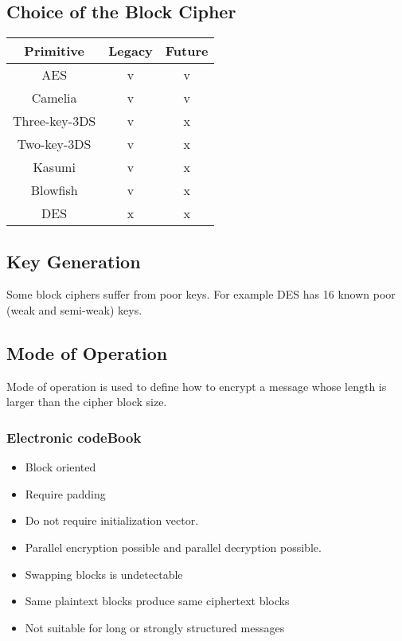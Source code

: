 
\subsection{Choice of the Block Cipher}
\begin{center}
    \begin{tabular}{|c|c|c|}
        \hline
        \textbf{Primitive} & \textbf{Legacy} & \textbf{Future} \\
        \hline
        AES & \textcolor{green!50!black}{v} &
        \textcolor{green!50!black}{v} \\
        Camelia & \textcolor{green!50!black}{v} &
        \textcolor{green!50!black}{v} \\
        \hline
        Three-key-3DS & \textcolor{green!50!black}{v} &
        \textcolor{red!50!black}{x} \\
        Two-key-3DS & \textcolor{green!50!black}{v} &
        \textcolor{red!50!black}{x} \\
        Kasumi & \textcolor{green!50!black}{v} &
        \textcolor{red!50!black}{x} \\
        Blowfish & \textcolor{green!50!black}{v} &
        \textcolor{red!50!black}{x} \\
        \hline
        DES & \textcolor{red!50!black}{x} & \textcolor{red!50!black}{x}\\
        \hline
    \end{tabular}
\end{center}

\subsection{Key Generation}
Some block ciphers suffer from poor keys. For example DES has 16 known poor
(weak and semi-weak) keys. %

\subsection{Mode of Operation} %
Mode of operation is used to define how to encrypt a message whose length
is larger than the cipher block size.
\subsubsection{Electronic codeBook}

\begin{itemize}
    \item Block oriented
    \item Require padding
    \item Do not require initialization vector.
    \item Parallel encryption possible and parallel decryption possible.
    \item Swapping blocks is undetectable
    \item Same plaintext blocks produce same ciphertext blocks
    \item Not suitable for long or strongly structured messages
\end{itemize}

